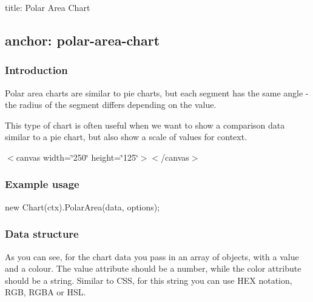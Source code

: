 

 title\+: Polar Area Chart \subsection*{anchor\+: polar-\/area-\/chart }

\subsubsection*{Introduction}

Polar area charts are similar to pie charts, but each segment has the same angle -\/ the radius of the segment differs depending on the value.

This type of chart is often useful when we want to show a comparison data similar to a pie chart, but also show a scale of values for context.

 $<$canvas width=\char`\"{}250\char`\"{} height=\char`\"{}125\char`\"{}$>$$<$/canvas$>$ 

\subsubsection*{Example usage}


\begin{DoxyCode}
new Chart(ctx).PolarArea(data, options);
\end{DoxyCode}


\subsubsection*{Data structure}


 As you can see, for the chart data you pass in an array of objects, with a value and a colour. The value attribute should be a number, while the color attribute should be a string. Similar to C\+SS, for this string you can use H\+EX notation, R\+GB, R\+G\+BA or H\+SL.

